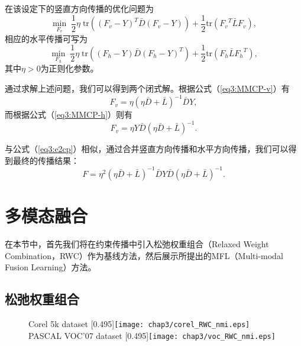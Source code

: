 在该设定下的竖直方向传播的优化问题为
\begin{equation}
\mathop{\mathrm{min}}_{{F_v}}\; \frac{1}{2}\eta\; \mathrm{tr}(({F_v}-{Y})^T\bar{{D}}({F_v}-{Y})) +\frac{1}{2}\mathrm{tr}({F_v}^T \bar{{L}}{F_v}),
\label{eq3:MMCP-v}
\end{equation}
相应的水平传播可写为
\begin{equation}
\mathop{\mathrm{min}}_{{F_h}}\;\frac{1}{2}\eta \;\mathrm{tr}( ({F_h}-{Y})\bar{{D}}({F_h}-{Y})^T)+\frac{1}{2}\mathrm{tr}({F_h} \bar{{L}}{F_h}^T),
\label{eq3:MMCP-h}
\end{equation}
其中$ \eta > 0  $为正则化参数。

通过求解上述问题，我们可以得到两个闭式解。根据公式（\ref{eq3:MMCP-v}）有
\begin{equation}
{F_v} = \eta(\eta \bar{{D}}+\bar{{L}})^{-1}\bar{{D}}{Y},
\label{eq3:sol-v}
\end{equation}
而根据公式（\ref{eq3:MMCP-h}）则有
\begin{equation}
{F_v} = \eta {Y}\bar{{D}}(\eta \bar{{D}}+\bar{{L}})^{-1}.
\label{eq3:sol-h}
\end{equation}

与公式（\ref{eq3:e2cp}）相似，通过合并竖直方向传播和水平方向传播，我们可以得到最终的传播结果：
\begin{equation}
{F} = \eta^2(\eta\bar{{D}}+\bar{{L}})^{-1}{\bar{{D}} Y\bar{{D}}}(\eta\bar{{D}}+\bar{{L}})^{-1}.
\label{}
\end{equation}

\section{多模态融合}
在本节中，首先我们将在约束传播中引入松弛权重组合（Relaxed Weight Combination，RWC）作为基线方法，然后展示所提出的MFL（Multi-modal Fusion Learning）方法。
\subsection{松弛权重组合}
\label{sec3:rwc}

\begin{figure}[t]
	\centering
					{Corel 5k dataset}
					[0.495\textwidth]{\texttt{[image: chap3/corel\_RWC\_nmi.eps]}
                    \label{fig3:rwc_corel}}
					{PASCAL VOC'07 dataset}
					[0.495\textwidth]{\texttt{[image: chap3/voc\_RWC\_nmi.eps]}
                    \label{fig3:rwc_voc}}
	\label{fig3:rwc}
\end{figure}

